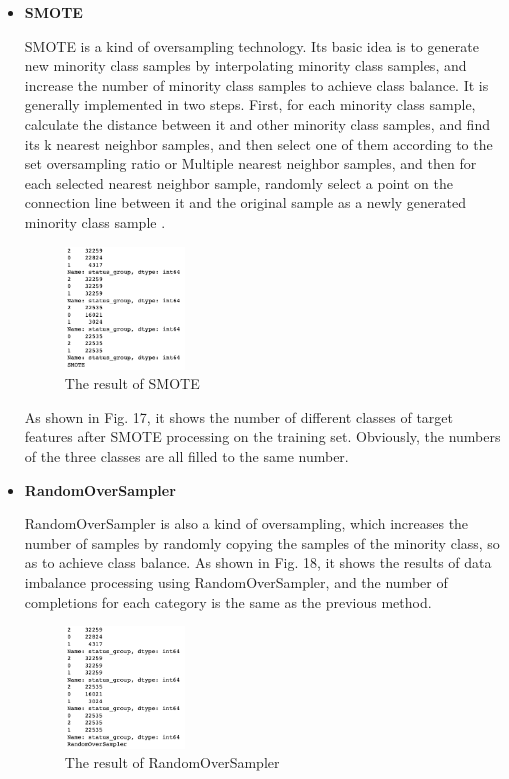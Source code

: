 \documentclass[conference]{IEEEtran}
\begin{document}
\begin{itemize}
\item \textbf{SMOTE}

SMOTE is a kind of oversampling technology. Its basic idea is to generate new minority class samples by interpolating minority class samples, and increase the number of minority class samples to achieve class balance. It is generally implemented in two steps. First, for each minority class sample, calculate the distance between it and other minority class samples, and find its k nearest neighbor samples, and then select one of them according to the set oversampling ratio or Multiple nearest neighbor samples, and then for each selected nearest neighbor sample, randomly select a point on the connection line between it and the original sample as a newly generated minority class sample \cite{b5}.

\begin{figure}[H]
\centerline{\includegraphics[width=0.3\textwidth]{16.pic.jpg}}
\caption{The result of SMOTE}
\end{figure}

As shown in Fig. 17, it shows the number of different classes of target features after SMOTE processing on the training set. Obviously, the numbers of the three classes are all filled to the same number.

\item \textbf{RandomOverSampler}

RandomOverSampler is also a kind of oversampling, which increases the number of samples by randomly copying the samples of the minority class, so as to achieve class balance. As shown in Fig. 18, it shows the results of data imbalance processing using RandomOverSampler, and the number of completions for each category is the same as the previous method.

\begin{figure}[H]
\centerline{\includegraphics[width=0.3\textwidth]{17.pic.jpg}}
\caption{The result of RandomOverSampler}
\end{figure}


\end{itemize}
\end{document}

